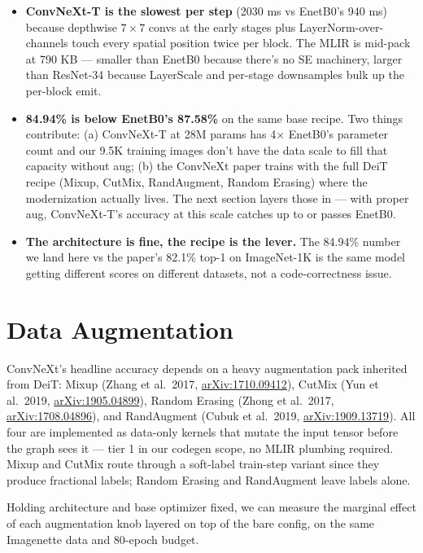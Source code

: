 \begin{itemize}
  \item \textbf{ConvNeXt-T is the slowest per step} (2030 ms vs
    EnetB0's 940 ms) because depthwise $7 \times 7$ convs at the
    early stages plus LayerNorm-over-channels touch every spatial
    position twice per block. The MLIR is mid-pack at 790 KB ---
    smaller than EnetB0 because there's no SE machinery, larger than
    ResNet-34 because LayerScale and per-stage downsamples bulk up
    the per-block emit.
  \item \textbf{84.94\% is below EnetB0's 87.58\%} on the same
    base recipe. Two things contribute: (a) ConvNeXt-T at 28M
    params has 4$\times$ EnetB0's parameter count and our 9.5K
    training images don't have the data scale to fill that
    capacity without aug; (b) the ConvNeXt paper trains with the
    full DeiT recipe (Mixup, CutMix, RandAugment, Random Erasing)
    where the modernization actually lives. The next section
    layers those in --- with proper aug, ConvNeXt-T's accuracy at
    this scale catches up to or passes EnetB0.
  \item \textbf{The architecture is fine, the recipe is the lever.}
    The 84.94\% number we land here vs the paper's 82.1\% top-1
    on ImageNet-1K is the same model getting different scores on
    different datasets, not a code-correctness issue.
\end{itemize}

\section{Data Augmentation}

ConvNeXt's headline accuracy depends on a heavy augmentation pack
inherited from DeiT: Mixup (Zhang et al.\ 2017,
\href{https://arxiv.org/abs/1710.09412}{arXiv:1710.09412}), CutMix
(Yun et al.\ 2019, \href{https://arxiv.org/abs/1905.04899}{arXiv:1905.04899}),
Random Erasing (Zhong et al.\ 2017,
\href{https://arxiv.org/abs/1708.04896}{arXiv:1708.04896}), and
RandAugment (Cubuk et al.\ 2019,
\href{https://arxiv.org/abs/1909.13719}{arXiv:1909.13719}). All four
are implemented as data-only kernels that mutate the input tensor
before the graph sees it --- tier 1 in our codegen scope, no MLIR
plumbing required. Mixup and CutMix route through a soft-label
train-step variant since they produce fractional labels; Random
Erasing and RandAugment leave labels alone.

Holding architecture and base optimizer fixed, we can measure the
marginal effect of each augmentation knob layered on top of the
bare config, on the same Imagenette data and 80-epoch budget.

